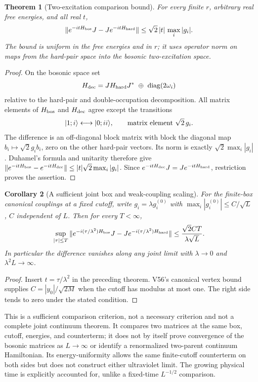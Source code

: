 \documentclass[11pt]{article}
\newtheorem{theorem}{Theorem}[section]
\newtheorem{corollary}[theorem]{Corollary}
\theoremstyle{remark}
\begin{document}
\begin{theorem}[Two-excitation comparison bound]
\label{thm:v20v57-comparison}
For every finite \(r\), arbitrary real free energies, and all
real \(t\),
\[
 \|e^{-itH_{\rm bos}}J-Je^{-itH_{\rm hard}}\|
       \leq\sqrt2\,|t|\,\max_i|g_i|.
\]
The bound is uniform in the free energies and in \(r\);
it uses operator norm on maps from the hard-pair space into
the bosonic two-excitation space.
\end{theorem}
\begin{proof}
On the bosonic space set
\[
 H_{\rm dec}=JH_{\rm hard}J^*\ \oplus\
                    \operatorname{diag}(2\omega_i)
\]
relative to the hard-pair and double-occupation decomposition.
All matrix elements of \(H_{\rm bos}\) and \(H_{\rm dec}\)
agree except the transitions
\[
 |1;i\rangle\longleftrightarrow|0;ii\rangle,
 \qquad\hbox{matrix element }\sqrt2\,g_i .
\]
The difference is an off-diagonal block matrix with block
the diagonal map \(b_i\mapsto\sqrt2g_i b_i\), zero on
the other hard-pair vectors.  Its norm is exactly
\(\sqrt2\max_i|g_i|\).  Duhamel's formula and unitarity
therefore give
\(\|e^{-itH_{\rm bos}}-e^{-itH_{\rm dec}}\|
\leq |t|\sqrt2\max_i|g_i|\).
Since \(e^{-itH_{\rm dec}}J=Je^{-itH_{\rm hard}}\),
restriction proves the assertion.
\end{proof}

\begin{corollary}[A sufficient joint box and weak-coupling scaling]
\label{cor:v20v57-scaling}
For the finite-box canonical couplings at a fixed cutoff,
write \(g_i=\lambda g_i^{(0)}\) with
\(\max_i|g_i^{(0)}|\leq C/\sqrt L\), \(C\) independent
of \(L\).  Then for every \(T<\infty\),
\[
 \sup_{|\tau|\leq T}
 \|e^{-i(\tau/\lambda^2)H_{\rm bos}}J
      -Je^{-i(\tau/\lambda^2)H_{\rm hard}}\|
        \leq\frac{\sqrt2 CT}{\lambda\sqrt L}.
\]
In particular the difference vanishes along any joint limit
with \(\lambda\to0\) and \(\lambda^2L\to\infty\).
\end{corollary}
\begin{proof}
Insert \(t=\tau/\lambda^2\) in the preceding theorem.
V56's canonical vertex bound supplies
\(C=|y_0|/\sqrt{2M}\) when the cutoff has modulus at most one.
The right side tends to zero under the stated condition.
\end{proof}

This is a sufficient comparison criterion, not a necessary
criterion and not a complete joint continuum theorem.
It compares two matrices at the same box, cutoff, energies,
and counterterm; it does not by itself prove convergence of
the bosonic matrices as \(L\to\infty\) or identify a
renormalized two-parent continuum Hamiltonian.  Its
energy-uniformity allows the same finite-cutoff counterterm
on both sides but does not construct either ultraviolet
limit.  The growing physical time is explicitly accounted
for, unlike a fixed-time \(L^{-1/2}\) comparison.
\end{document}
